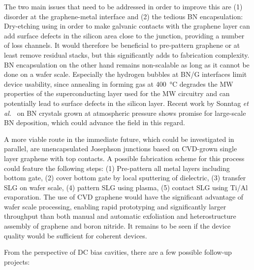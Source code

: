 The two main issues that need to be addressed in order to improve this are (1) disorder at the graphene-metal interface and (2) the tedious BN encapsulation:
Dry-etching using  in order to make galvanic contacts with the graphene layer can add surface defects in the silicon area close to the junction, providing a number of loss channels.
%
It would therefore be beneficial to pre-pattern graphene or at least remove residual stacks, but this significantly adds to fabrication complexity.
%
BN encapsulation on the other hand remains non-scalable as long as it cannot be done on a wafer scale.
%
Especially the hydrogen bubbles at BN/G interfaces limit device usability, since annealing in forming gas at \SI{400}{\celsius} degrades the MW properties of the superconducting layer used for the MW circuitry and can potentially lead to surface defects in the silicon layer.
%
Recent work by Sonntag \textit{et al.}~\cite{sonntagExcellentElectronicTransport2020} on BN crystals grown at atmospheric pressure shows promise for large-scale BN deposition, which could advance the field in this regard.

A more viable route in the immediate future, which could be investigated in parallel, are unencapsulated Josephson junctions based on CVD-grown single layer graphene with top contacts.
%
A possible fabrication scheme for this process could feature the following steps:
%
(1) Pre-pattern all metal layers including bottom gate, (2) cover bottom gate by local sputtering of dielectric, (3) transfer SLG on wafer scale, (4) pattern SLG using  plasma, (5) contact SLG using Ti/Al evaporation.
%
The use of CVD graphene would have the significant advantage of wafer scale processing, enabling rapid prototyping and significantly larger throughput than both manual and automatic exfoliation and heterostructure assembly of graphene and boron nitride.
%
It remains to be seen if the device quality would be sufficient for coherent devices.


From the perspective of DC bias cavities, there are a few possible follow-up projects:

